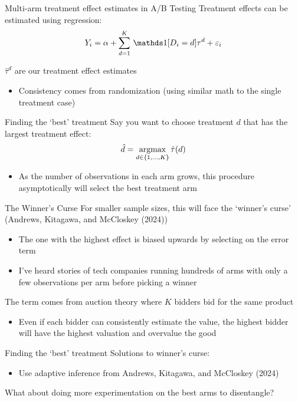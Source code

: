\documentclass[aspectratio=169,t,11pt,table]{beamer}
\begin{document}
\begin{frame}{Multi-arm treatment effect estimates in A/B Testing}
	Treatment effects can be estimated using regression:
	$$
		Y_i = \alpha + \sum_{d = 1}^K \one{D_i = d} \tau^d + \varepsilon_i
	$$

	$\hat{\tau}^d$ are our treatment effect estimates
	\begin{itemize}
		\item Consistency comes from randomization (using similar math to the single treatment case)
	\end{itemize}
\end{frame}

\begin{frame}{Finding the `best' treatment}
	Say you want to choose treatment $d$ that has the largest treatment effect:
	$$
		\hat{d} = \operatorname*{argmax}_{d \in \{1, \dots, K\}} \hat{\tau}(d)
	$$
	\begin{itemize}
		\item As the number of observations in each arm grows, this procedure asymptotically will select the best treatment arm
	\end{itemize}
\end{frame}

\begin{frame}{The Winner's Curse}
	For smaller sample sizes, this will face the `winner's curse' (Andrews, Kitagawa, and McCloskey (2024))
	\begin{itemize}
		\item The one with the highest effect is biased upwards by selecting on the error term
		\pause
		\item I've heard stories of tech companies running hundreds of arms with only a few observations per arm before picking a winner
	\end{itemize}

	\pause
	\bigskip
	The term comes from auction theory where $K$ bidders bid for the same product
	\begin{itemize}
		\item Even if each bidder can consistently estimate the value, the highest bidder will have the highest valuation and overvalue the good
	\end{itemize}
\end{frame}

\begin{frame}{Finding the `best' treatment}
	Solutions to winner's curse:
	\begin{itemize}
		\item Use adaptive inference from Andrews, Kitagawa, and McCloskey (2024)
	\end{itemize}

	\bigskip
	What about doing more experimentation on the best arms to disentangle?
\end{frame}
\end{document}
